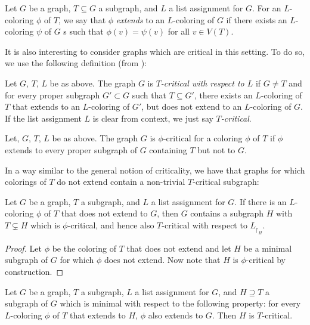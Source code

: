 \begin{definition}[Extending]
	Let $G$ be a graph, $T \subseteq G$ a subgraph, and $L$ a list assignment
	for $G$. For an $L$-coloring $\phi$ of $T$, we say that $\phi$ \emph{extends}
	to an $L$-coloring of $G$ if there exists an $L$-coloring $\psi$ of $G$
s	such that $\phi(v) = \psi(v)$ for all $v \in V(T)$. 
	
\end{definition}

It is also interesting to consider graphs which are critical in this setting. To do so, we use the following definition (from \cite{fivelistcoloring2}):

\begin{definition}[$T$-critical]
	Let $G$, $T$, $L$ be as above. The graph $G$ is \emph{$T$-critical with respect to $L$} if $G \neq T$ and for every proper subgraph $G' \subset G$ such that $T \subseteq G'$, there exists an $L$-coloring of $T$ that extends to an $L$-coloring of $G'$, but does not extend to an $L$-coloring of $G$. If the list assignment $L$ is clear from context, we just say \emph{$T$-critical}.
\end{definition}

\begin{definition}
	Let, $G$, $T$, $L$ be as above. The graph $G$ is $\phi$-critical for a coloring $\phi$ of $T$ if $\phi$ extends to every proper subgraph of $G$ containing $T$ but not to $G$.
\end{definition}

In a way similar to the general notion of criticality, we have that graphs for which colorings of $T$ do not extend contain a non-trivial $T$-critical subgraph:

\begin{lemma}
Let $G$ be a graph, $T$ a subgraph, and $L$ a list assignment for $G$. If there 
is an $L$-coloring $\phi$ of $T$ that does not extend to $G$, 
then $G$ contains a subgraph $H$ with $T \subsetneq H$ which 
is $\phi$-critical, and hence also $T$-critical with respect 
to $L_{\restriction_H}$. 
\end{lemma}

\begin{proof}
Let $\phi$ be the coloring of $T$ that does not extend and let $H$ be a minimal subgraph 
of $G$ for which $\phi$ does not extend. Now note that $H$ is $\phi$-critical 
by construction.
\end{proof}

\begin{lemma}
\label{minimalsubgraphlemma}
Let $G$ be a graph, $T$ a subgraph, $L$ a list assignment for $G$, and $H \supseteq T$ 
a subgraph of $G$ which is minimal with respect to the following property: 
for every $L$-coloring $\phi$ of $T$ that extends to $H$, $\phi$ also extends to $G$. 
Then $H$ is $T$-critical.
\end{lemma}

